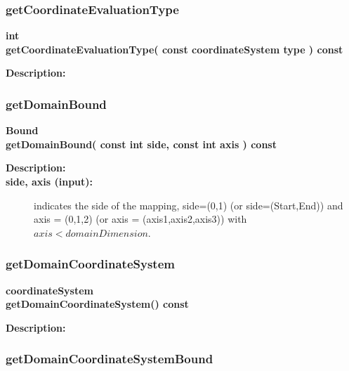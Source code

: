 \subsubsection{getCoordinateEvaluationType}
 
\begin{flushleft} \textbf{%
int  \\ 
\settowidth{\MappingIncludeArgIndent}{getCoordinateEvaluationType(}%
getCoordinateEvaluationType( const coordinateSystem type ) const 
}\end{flushleft}
\begin{description}
\item[{\bf Description:}] 
\end{description}
\subsubsection{getDomainBound}
 
\begin{flushleft} \textbf{%
Bound  \\ 
\settowidth{\MappingIncludeArgIndent}{getDomainBound(}%
getDomainBound( const int side, const int axis ) const
}\end{flushleft}
\begin{description}
\item[{\bf Description:}] 
    
\item[{\bf side, axis (input):}]  indicates the side of the mapping, side=(0,1) (or side=(Start,End)) 
     and axis = (0,1,2) (or axis = (axis1,axis2,axis3)) with $axis<domainDimension$.
\end{description}
\subsubsection{getDomainCoordinateSystem}
 
\begin{flushleft} \textbf{%
coordinateSystem  \\ 
\settowidth{\MappingIncludeArgIndent}{getDomainCoordinateSystem(}%
getDomainCoordinateSystem() const 
}\end{flushleft}
\begin{description}
\item[{\bf Description:}] 
\end{description}
\subsubsection{getDomainCoordinateSystemBound}
 
